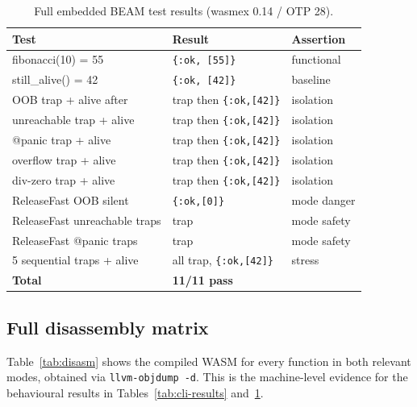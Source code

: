 \documentclass[11pt,a4paper]{article}
\begin{document}
\begin{table}[h]
\centering
\begin{tabular}{lll}
\toprule
\textbf{Test} & \textbf{Result} & \textbf{Assertion} \\
\midrule
fibonacci(10) = 55        & \texttt{\{:ok, [55]\}}  & functional \\
still\_alive() = 42       & \texttt{\{:ok, [42]\}}  & baseline \\
OOB trap + alive after    & trap then \texttt{\{:ok,[42]\}} & isolation \\
unreachable trap + alive  & trap then \texttt{\{:ok,[42]\}} & isolation \\
@panic trap + alive       & trap then \texttt{\{:ok,[42]\}} & isolation \\
overflow trap + alive     & trap then \texttt{\{:ok,[42]\}} & isolation \\
div-zero trap + alive     & trap then \texttt{\{:ok,[42]\}} & isolation \\
ReleaseFast OOB silent    & \texttt{\{:ok,[0]\}}    & mode danger \\
ReleaseFast unreachable traps & trap             & mode safety \\
ReleaseFast @panic traps  & trap                   & mode safety \\
5 sequential traps + alive& all trap, \texttt{\{:ok,[42]\}} & stress \\
\midrule
\textbf{Total}            & \textbf{11/11 pass}    & \\
\bottomrule
\end{tabular}
\caption{Full embedded BEAM test results (wasmex 0.14 / OTP 28).}
\label{tab:beam-results}
\end{table}

\subsection{Full disassembly matrix}
\label{sec:disassembly-matrix}

Table~\ref{tab:disasm} shows the compiled WASM for every function in both
relevant modes, obtained via \texttt{llvm-objdump -d}. This is the machine-level
evidence for the behavioural results in Tables~\ref{tab:cli-results}
and~\ref{tab:beam-results}.
\end{document}
